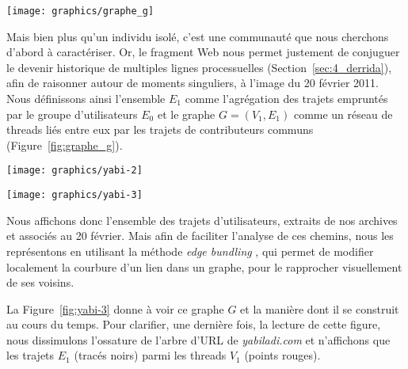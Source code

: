 \documentclass[symmetric,justified,marginals=raggedouter]{tufte-book}
\begin{document}
\begin{marginfigure}%
  \vspace{1.0cm}
  \texttt{[image: graphics/graphe\_g]}
  \vspace*{0.2cm}  
  \caption{Le graphe $G=(V_1,E_1)$ pour $V_1$ contenant quatre threads de messages}
  \label{fig:graphe_g}
\end{marginfigure} 

Mais bien plus qu'un individu isolé, c'est une communauté que nous cherchons d'abord à caractériser. Or, le fragment Web nous permet justement de conjuguer le devenir historique de multiples lignes processuelles (Section~\ref{sec:4_derrida}), afin de raisonner autour de moments singuliers, à l'image du 20 février 2011. Nous définissons ainsi l'ensemble $E_1$ comme l'agrégation des trajets empruntés par le groupe d'utilisateurs $E_0$ et le graphe $G=(V_1,E_1)$ comme un réseau de threads liés entre eux par les trajets de contributeurs communs (Figure~\ref{fig:graphe_g}). 

\begin{figure*}[hbtp]%
  \texttt{[image: graphics/yabi-2]}
  \caption{Exemple de trajet individuel (tracé bleu clair) parmi 66 threads du forum \textit{yabiladi.com}}
  \label{fig:yabi-2}
\end{figure*}

\begin{figure*}[hbtp]%
  \texttt{[image: graphics/yabi-3]}
  \caption{Trajets agrégés $E_1$ de l'ensemble des contributeurs des threads $V_1$ du forum \textit{yabiladi.com}}
  \label{fig:yabi-3}
\end{figure*}

\noindent Nous affichons donc l'ensemble des trajets d'utilisateurs, extraits de nos archives et associés au 20 février. Mais afin de faciliter l'analyse de ces chemins, nous les représentons en utilisant la méthode \textit{edge bundling} \citep{holten_hierarchical_2006}, qui permet de modifier localement la courbure d'un lien dans un graphe, pour le rapprocher visuellement de ses voisins. 

La Figure~\ref{fig:yabi-3} donne à voir ce graphe $G$ et la manière dont il se construit au cours du temps. Pour clarifier, une dernière fois, la lecture de cette figure, nous dissimulons l'ossature de l'arbre d'URL de \textit{yabiladi.com} et n'affichons que les trajets $E_1$ (tracés noirs) parmi les threads $V_1$ (points rouges).\\
\end{document}
